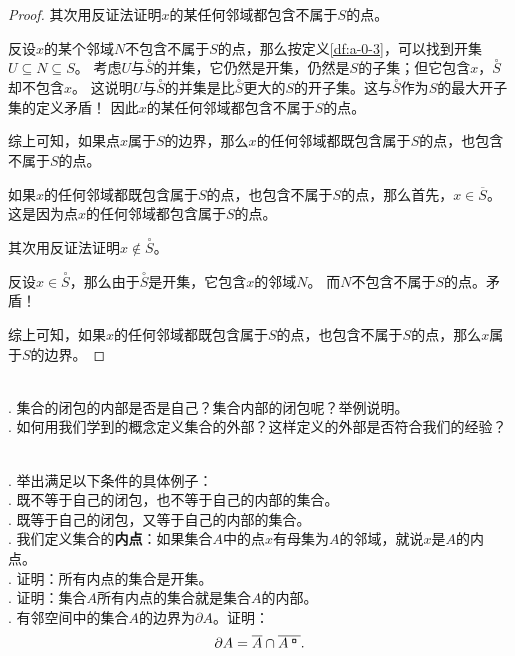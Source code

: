 \documentclass[12pt,UTF8]{ctexbook}
\begin{document}
\begin{appendix}
\begin{proof}
    其次用反证法证明$x$的某任何邻域都包含不属于$S$的点。
    
    反设$x$的某个邻域$N$不包含不属于$S$的点，那么按定义\ref{df:a-0-3}，可以找到开集$U\subseteq N\subseteq S$。
    考虑$U$与$\overset{\circ}{S}$的并集，它仍然是开集，仍然是$S$的子集；但它包含$x$，$\overset{\circ}{S}$却不包含$x$。
    这说明$U$与$\overset{\circ}{S}$的并集是比$\overset{\circ}{S}$更大的$S$的开子集。这与$\overset{\circ}{S}$作为$S$的最大开子集的定义矛盾！
    因此$x$的某任何邻域都包含不属于$S$的点。

    综上可知，如果点$x$属于$S$的边界，那么$x$的任何邻域都既包含属于$S$的点，也包含不属于$S$的点。

    如果$x$的任何邻域都既包含属于$S$的点，也包含不属于$S$的点，那么首先，$x\in \overline{S}$。这是因为点$x$的任何邻域都包含属于$S$的点。
    
    其次用反证法证明$x\notin\overset{\circ}{S}$。
    
    反设$x\in \overset{\circ}{S}$，那么由于$\overset{\circ}{S}$是开集，它包含$x$的邻域$N$。
    而$N$不包含不属于$S$的点。矛盾！

    综上可知，如果$x$的任何邻域都既包含属于$S$的点，也包含不属于$S$的点，那么$x$属于$S$的边界。

\end{proof}

\begin{sk}
    \mbox{} \\
    . 集合的闭包的内部是否是自己？集合内部的闭包呢？举例说明。\\
    . 如何用我们学到的概念定义集合的外部？这样定义的外部是否符合我们的经验？
\end{sk}

\begin{xt}
    \mbox{} \\
    . 举出满足以下条件的具体例子：\\
    . 既不等于自己的闭包，也不等于自己的内部的集合。\\
    . 既等于自己的闭包，又等于自己的内部的集合。\\
    . 我们定义集合的\textbf{内点}：如果集合$A$中的点$x$有母集为$A$的邻域，就说$x$是$A$的内点。\\
    . 证明：所有内点的集合是开集。\\
    . 证明：集合$A$所有内点的集合就是集合$A$的内部。\\
    . 有邻空间中的集合$A$的边界为$\partial A$。证明：
    $$ \partial A = \overline{A} \cap \overline{A^{\bu}}. $$
\end{xt}



\end{appendix}
\end{document}

